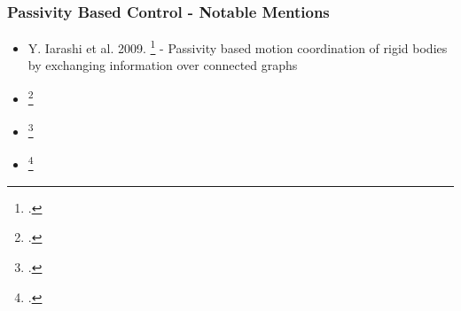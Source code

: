 \begin{frame}
	\frametitle{Passivity Based Control - Notable Mentions}
	\begin{itemize}
		\item Y. Iarashi et al. 2009. \footcite{passivity-attitude-sync} - Passivity based motion coordination of rigid bodies by exchanging information over connected graphs 
		\item \footcite{cooperative-control-quadrotor}
		\item \footcite{group-teleoperation}
		\item \footcite{haptic-teleoperation-uav}
	\end{itemize}
\end{frame}